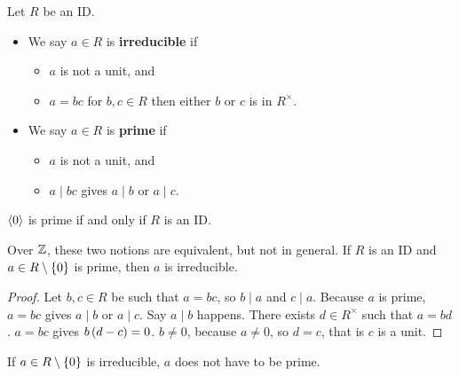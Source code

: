 \begin{definition}
Let $ R $ be an ID.
\begin{itemize}
\item We say $ a \in R $ is \textbf{irreducible} if
\begin{itemize}
\item $ a $ is not a unit, and
\item $ a = bc $ for $ b, c \in R $ then either $ b $ or $ c $ is in $ R^\times $.
\end{itemize}
\item We say $ a \in R $ is \textbf{prime} if
\begin{itemize}
\item $ a $ is not a unit, and
\item $ a \mid bc $ gives $ a \mid b $ or $ a \mid c $.
\end{itemize}
\end{itemize}
\end{definition}

$ \left\langle 0 \right\rangle $ is prime if and only if $ R $ is an ID.

\begin{remark*}
Over $ \mathbb{Z} $, these two notions are equivalent, but not in general. If $ R $ is an ID and $ a \in R \setminus \left\{ 0 \right\} $ is prime, then $ a $ is irreducible.
\end{remark*}

\begin{proof}
Let $ b, c \in R $ be such that $ a = bc $, so $ b \mid a $ and $ c \mid a $. Because $ a $ is prime, $ a = bc $ gives $ a \mid b $ or $ a \mid c $. Say $ a \mid b $ happens. There exists $ d \in R^\times $ such that $ a = bd $. $ a = bc $ gives $ b\left( d - c \right) = 0 $. $ b \ne 0 $, because $ a \ne 0 $, so $ d = c $, that is $ c $ is a unit.
\end{proof}

\begin{remark*}
If $ a \in R \setminus \left\{ 0 \right\} $ is irreducible, $ a $ does not have to be prime.
\end{remark*}

